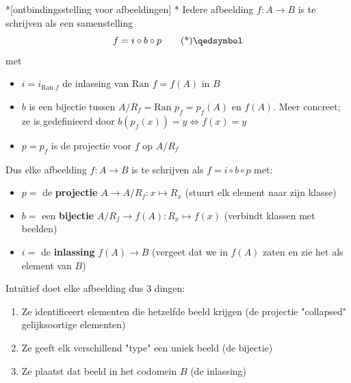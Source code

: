 \begin{nicetheorem}*[ontbindingsstelling voor afbeeldingen]\label{stelling:H3_ontbindingsstelling}
    \nextpart[]*
    Iedere afbeelding $f:A \to B$ is te schrijven als een samenstelling
    \begin{equation}
        f = i \circ b \circ p \qedtag
    \end{equation}
    met
    \begin{itemize}
        \item $i = i_{\text{Ran }f}$ de inlassing van $\text{Ran }f = f(A)$ in $B$
        \item $b$ is een bijectie tussen $A/R_f = \text{Ran }p_f = p_f(A)$ en $f(A)$. Meer concreet; ze is gedefinieerd door $b(p_f(x)) = y \Leftrightarrow f(x) = y$
        \item $p = p_f$ is de projectie voor $f$ op $A/R_f$
    \end{itemize}
\end{nicetheorem}

\begin{center}
\resizebox{0.65\textwidth}{!}{%
    
}
\end{center}

Dus elke afbeelding $f:A \to B$ is te schrijven als $f = i \circ b \circ p$ met:
\begin{itemize}
    \item $p =$ de \textbf{projectie} $A \to A/R_f : x \mapsto R_x$ (stuurt elk element naar zijn klasse)
    \item $b =$ een \textbf{bijectie} $A/R_f \to f(A) : R_x \mapsto f(x)$ (verbindt klassen met beelden)
    \item $i =$ de \textbf{inlassing} $f(A) \to B$ (vergeet dat we in $f(A)$ zaten en zie het als element van $B$)
\end{itemize}
Intuïtief doet elke afbeelding dus 3 dingen:
\begin{enumerate}
    \item Ze identificeert elementen die hetzelfde beeld krijgen (de projectie "collapsed" gelijksoortige elementen)
    \item Ze geeft elk verschillend "type" een uniek beeld (de bijectie)
    \item Ze plaatst dat beeld in het codomein $B$ (de inlassing)
\end{enumerate}

